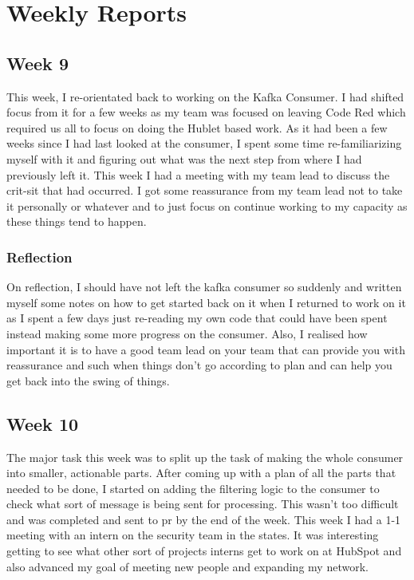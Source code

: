 \chapter{Weekly Reports}
\section{Week 9}
This week, I re-orientated back to working on the Kafka Consumer. I had shifted focus from it for a few weeks as my team was focused on leaving Code Red which required us all to focus on doing the Hublet based work. As it had been a few weeks since I had last looked at the consumer, I spent some time re-familiarizing myself with it and figuring out what was the next step from where I had previously left it. \newline This week I had a meeting with my team lead to discuss the crit-sit that had occurred. I got some reassurance from my team lead not to take it personally or whatever and to just focus on continue working to my capacity as these things tend to happen. 

\subsection{Reflection}
On reflection, I should have not left the kafka consumer so suddenly and written myself some notes on how to get started back on it when I returned to work on it as I spent a few days just re-reading my own code that could have been spent instead making some more progress on the consumer. Also, I realised how important it is to have a good team lead on your team that can provide you with reassurance and such when things don't go according to plan and can help you get back into the swing of things.
\section{Week 10}
The major task this week was to split up the task of making the whole consumer into smaller, actionable parts. After coming up with a plan of all the parts that needed to be done, I started on adding the filtering logic to the consumer to check what sort of message is being sent for processing. This wasn't too difficult and was completed and sent to pr by the end of the week. \newline This week I had a 1-1 meeting with an intern on the security team in the states. It was interesting getting to see what other sort of projects interns get to work on at HubSpot and also advanced my goal of meeting new people and expanding my network.

